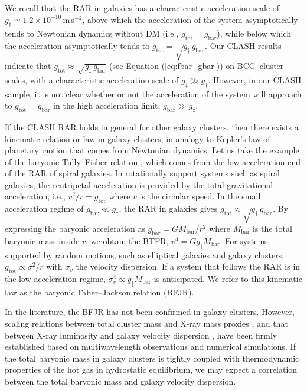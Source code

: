 \documentclass[a4paper,iop,twocolumn,twocolappendix,numberedappendix,appendixfloats]{emulateapj}
\newcommand{\Mbar}{M_\mathrm{bar}}
\newcommand{\gbar}{g_\mathrm{bar}}
\newcommand{\gtot}{g_\mathrm{tot}}
\begin{document}
We recall that the RAR in galaxies has  a characteristic acceleration
scale of $g_\dag\simeq 1.2\times 10^{-10}$\,m\,s$^{-2}$,
above which the acceleration of the system asymptotically tends to
Newtonian dynamics without DM (i.e., $\gtot=\gbar$),
while below which the acceleration asymptotically tends to
$\gtot=\sqrt{g_\dag\, \gbar}$.
Our CLASH results indicate that $\gtot\approx\sqrt{g_\ddag\, \gbar}$
(see Equation (\ref{eq:fbar_gbar})) on BCG--cluster scales, with a
characteristic acceleration scale of $g_\ddag \gg g_\dag$.
However, in our CLASH sample, it is not clear whether or not the
acceleration of the system will approach to $\gtot=\gbar$
in the high acceleration limit, $\gbar\gg g_\ddag$.

If the CLASH RAR holds in general for other galaxy clusters,
then there exists a kinematic relation or law in galaxy clusters,
in analogy to Kepler's law of planetary motion that comes from Newtonian dynamics.
Let us take the example of the baryonic Tully--Fisher relation
\citep[BTFR; e.g.,][]{McGaugh11, McGaugh12, FM12},
 which comes from the low acceleration end of the RAR of spiral galaxies.
In rotationally support systems such as spiral galaxies, the centripetal
acceleration is provided by the total gravitational acceleration,
i.e., $v^2/r=\gtot$ where $v$ is the circular speed.
In the small acceleration regime of $\gbar\ll g_\dag$,
the RAR in galaxies gives $\gtot\approx\sqrt{g_\dag\, \gbar}$.
By expressing the baryonic acceleration as $\gbar=G\Mbar/r^2$
where $\Mbar$ is the total baryonic mass inside $r$,
we obtain the BTFR, $v^4=G g_{\dag}\Mbar$.
For systems supported by random motions, such as elliptical galaxies and galaxy
clusters, $\gtot\propto\sigma^2/r$ with $\sigma_v$ the velocity dispersion.
If a system that follows the RAR is in the low acceleration regime,
$\sigma_v^4\propto g_{\ddag}\Mbar$ is anticipated.
We refer to this kinematic law as the baryonic Faber--Jackson relation
(BFJR).

In the literature, the BFJR has not been confirmed in galaxy
clusters.  However, scaling relations between total cluster mass and
X-ray mass proxies \citep[e.g., X-ray gas temperature;][]{Sanders94,
Ettori04, Angus08, FM12}, and that between X-ray luminosity and galaxy
velocity dispersion \citep{XW00, Sanders10, Zhang11, Nastasi14}, have
been firmly established based on multiwavelength observations and
numerical simulations.
If the total baryonic mass in galaxy clusters is
tightly coupled with thermodynamic properties of the hot gas in
hydrostatic equilibrium, we may expect a correlation between
the total baryonic mass and galaxy velocity dispersion.
\end{document}
